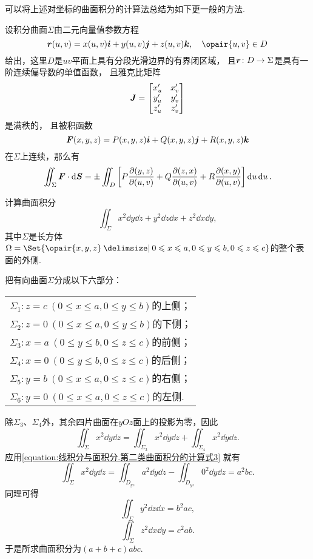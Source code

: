 可以将上述对坐标的曲面积分的计算法总结为如下更一般的方法.
\begin{theorem}
设积分曲面\(\Sigma\)由二元向量值参数方程\[
\mat{r}(u,v) = x(u,v) \mat{i} + y(u,v) \mat{j} + z(u,v) \mat{k},
\quad \opair{u,v} \in D
\]给出，这里\(D\)是\(uv\)平面上具有分段光滑边界的有界闭区域，%
且\(\boldsymbol{r}\colon D \to \Sigma\)是具有一阶连续偏导数的单值函数，%
且雅克比矩阵\[
\boldsymbol{J} = \begin{bmatrix}
x'_u & x'_v \\
y'_u & y'_v \\
z'_u & z'_v
\end{bmatrix}
\]是满秩的，%
且被积函数\[
\boldsymbol{F}(x,y,z) = P(x,y,z) \boldsymbol{i} + Q(x,y,z) \boldsymbol{j} + R(x,y,z) \boldsymbol{k}
\]在\(\Sigma\)上连续，那么有\[
\iint_{\Sigma} \boldsymbol{F} \cdot \dd{\boldsymbol{S}}
= \pm \iint_D \left[
	P \pdv{ (y,z) }{ (u,v) }
	+ Q \pdv{ (z,x) }{ (u,v) }
	+ R \pdv{ (x,y) }{ (u,v) }
\right] \dd{u}\dd{u}.
\]
\end{theorem}

\begin{example}
计算曲面积分\[
\iint_{\Sigma} x^2 \dd{y}\dd{z} + y^2 \dd{z}\dd{x} + z^2 \dd{x}\dd{y},
\]其中\(\Sigma\)是长方体\(\Omega = \Set{
\opair{x,y,z} \given
0 \leqslant x \leqslant a,
0 \leqslant y \leqslant b,
0 \leqslant z \leqslant c
}\)的整个表面的外侧.
\begin{solution}
把有向曲面\(\Sigma\)分成以下六部分：
\begin{center}\begin{tabular}{l}
\(\Sigma_1: z=c\ (0 \leqslant x \leqslant a, 0 \leqslant y \leqslant b)\)的上侧； \\
\(\Sigma_2: z=0\ (0 \leqslant x \leqslant a, 0 \leqslant y \leqslant b)\)的下侧； \\
\(\Sigma_3: x=a\ (0 \leqslant y \leqslant b, 0 \leqslant z \leqslant c)\)的前侧； \\
\(\Sigma_4: x=0\ (0 \leqslant y \leqslant b, 0 \leqslant z \leqslant c)\)的后侧； \\
\(\Sigma_5: y=b\ (0 \leqslant x \leqslant a, 0 \leqslant z \leqslant c)\)的右侧； \\
\(\Sigma_6: y=0\ (0 \leqslant x \leqslant a, 0 \leqslant z \leqslant c)\)的左侧. \\
\end{tabular}\end{center}
除\(\Sigma_3\)、\(\Sigma_4\)外，其余四片曲面在\(yOz\)面上的投影为零，因此\[
\iint_{\Sigma} x^2 \dd{y}\dd{z}
= \iint_{\Sigma_3} x^2 \dd{y}\dd{z}
+ \iint_{\Sigma_4} x^2 \dd{y}\dd{z}.
\]应用\cref{equation:线积分与面积分.第二类曲面积分的计算式3} 就有\[
\iint_{\Sigma} x^2 \dd{y}\dd{z}
= \iint_{D_{yz}} a^2 \dd{y}\dd{z}
- \iint_{D_{yz}} 0^2 \dd{y}\dd{z}
= a^2 bc.
\]同理可得\[
\iint_{\Sigma} y^2 \dd{z}\dd{x}
= b^2 ac,
\]\[
\iint_{\Sigma} z^2 \dd{x}\dd{y}
= c^2 ab.
\]于是所求曲面积分为\((a+b+c) abc\).
\end{solution}
\end{example}

